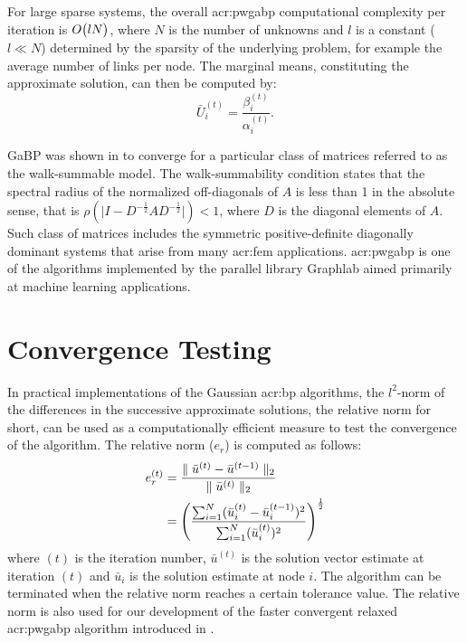For large sparse systems, the overall \gls{acr:pwgabp} computational complexity per iteration is $ O\bigl(lN\bigr)$,  where $N$ is the number of unknowns and $l$ is a constant ($l \ll N$) determined by the sparsity of the underlying problem, for example the average number of links per node.  
The marginal means, constituting the approximate solution, can then be computed by:
\begin{equation}
\label{eqn_x_i}
\bar{U}_i^{(t)} = \frac{\beta_i^{(t)}}{\alpha_i^{(t)}}. 
\end{equation}





GaBP was shown in \cite{bib:Johnson2006WIAGBP} to converge for a particular class of matrices referred to as the walk-summable model.
The walk-summability condition states that the spectral radius of the normalized off-diagonals of $A$ is less than 1 in the absolute sense, that is $\rho(\vert I - D^{-\frac{1}{2}} A D^{-\frac{1}{2}}\vert) < 1$, where $D$ is the diagonal elements of $A$.
Such class of matrices includes the symmetric positive-definite diagonally dominant systems that arise from many \gls{acr:fem} applications.
\gls{acr:pwgabp} is one of the algorithms implemented by the parallel library Graphlab \cite{bib:graphlab2010} aimed primarily at machine learning applications.


\section{Convergence Testing}
\label{sec:convtest}
In practical implementations of the Gaussian \gls{acr:bp} algorithms, the $l^2$-norm of the differences in the successive approximate solutions, the relative norm for short, can be used as a computationally efficient measure to test the convergence of the algorithm.
The relative norm ($e_r$) is computed as follows:
\begin{align} 
	e^{(t)}_r & =  \frac{\parallel \bar{u}^{(t)} - \bar{u}^{(t-1)} \parallel_2}{\parallel \bar{u}^{(t)} \parallel_2} \notag \\
		& = \left(\frac{\sum_{i=1}^{N} (\bar{u}_i^{(t)} - \bar{u}_i^{(t-1)})^2} {\sum_{i=1}^{N} (\bar{u}_i^{(t)})^2}\right)^{\frac{1}{2}} \label{eq_relErr}
\end{align}
where $(t)$ is the iteration number, $\bar{u}^{(t)}$ is the solution vector estimate at iteration $(t)$ and $\bar{u}_i$ is the solution estimate at node $i$.
The algorithm can be terminated when the relative norm reaches a certain tolerance value.
The relative norm is also used for our development of the faster convergent relaxed \gls{acr:pwgabp} algorithm introduced in .

